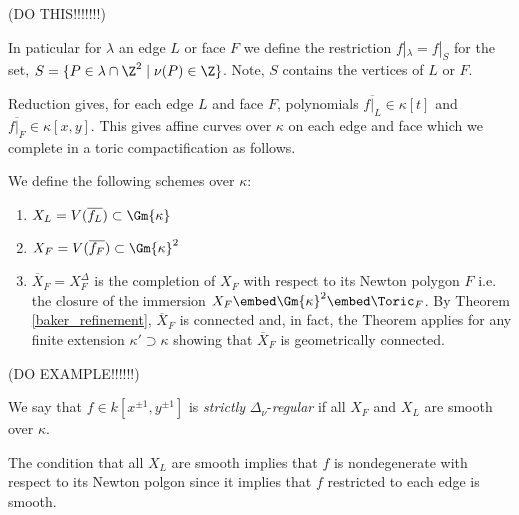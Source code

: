 \begin{example}
(DO THIS!!!!!!!)
\end{example}

\begin{defn}
In paticular for $\lambda$ an edge $L$ or face $F$ we define the restriction $f |_\lambda = f|_S$ for the set, $S = \{ P \in \lambda \cap \Z^2 \mid \nu(P) \in \Z \}$. Note, $S$ contains the vertices of $L$ or $F$.  
\end{defn}

\begin{rmk}
Reduction gives, for each edge $L$ and face $F$, polynomials $\overline{f|_L} \in \kappa[t]$ and $\overline{f|_F} \in \kappa[x, y]$. This gives affine curves over $\kappa$ on each edge and face which we complete in a toric compactification as follows.
\end{rmk}

\begin{defn}[Components]
We define the following schemes over $\kappa$:
\begin{enumerate}
\item $X_L = V(\overline{f_L}) \subset \Gm{\kappa}$ 
\item $X_F = V(\overline{f_F}) \subset \Gm{\kappa}^2$
\item $\overline{X}_F = X_F^\Delta$ is the completion of $X_F$ with respect to its Newton polygon $F$ i.e. the closure of the immersion $X_F \embed \Gm{\kappa}^2 \embed \Toric_F$. By Theorem \ref{baker_refinement}, $\overline{X}_F$ is connected and, in fact, the Theorem applies for any finite extension $\kappa' \supset \kappa$ showing that $\overline{X}_F$ is geometrically connected.
\end{enumerate}
\end{defn}

\begin{example}
(DO EXAMPLE!!!!!!)
\end{example}

\begin{defn}
We say that $f \in k[x^{\pm 1}, y^{\pm 1}]$ is \textit{strictly} $\Delta_\nu$-\textit{regular} if all $X_F$ and $X_L$ are smooth over $\kappa$. 
\end{defn}

\begin{rmk}
The condition that all $X_L$ are smooth implies that $f$ is nondegenerate with respect to its Newton polgon since it implies that $f$ restricted to each edge is smooth. 
\end{rmk}

